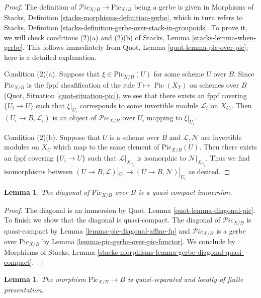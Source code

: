 \documentclass{stacks-project}
\theoremstyle{plain}
\newtheorem{lemma}[subsection]{Lemma}
\theoremstyle{definition}
\theoremstyle{remark}
\numberwithin{equation}{subsection}
\def\Pic{\mathop{\mathrm{Pic}}\nolimits}
\def\Picardstack{\mathcal{P}\!\mathit{ic}}
\def\Picardfunctor{\mathrm{Pic}}
\begin{document}
\begin{proof}
The definition of $\Picardstack_{X/B} \to \Picardfunctor_{X/B}$ being
a gerbe is given in Morphisms of Stacks, Definition
\ref{stacks-morphisms-definition-gerbe}, which in turn refers to
Stacks, Definition \ref{stacks-definition-gerbe-over-stack-in-groupoids}.
To prove it, we will check conditions (2)(a) and (2)(b) of
Stacks, Lemma \ref{stacks-lemma-when-gerbe}. This follows immediately from
Quot, Lemma \ref{quot-lemma-pic-over-pic}; here is a detailed explanation.

\medskip\noindent
Condition (2)(a).
Suppose that $\xi \in \Picardfunctor_{X/B}(U)$ for some scheme $U$ over $B$.
Since $\Picardfunctor_{X/B}$ is the fppf sheafification of the rule
$T \mapsto \Pic(X_T)$ on schemes over $B$
(Quot, Situation \ref{quot-situation-pic}), we see that there exists an
fppf covering $\{U_i \to U\}$ such that $\xi|_{U_i}$ corresponds
to some invertible module $\mathcal{L}_i$ on $X_{U_i}$.
Then $(U_i \to B, \mathcal{L}_i)$ is an object of
$\Picardstack_{X/B}$ over $U_i$ mapping to $\xi|_{U_i}$.

\medskip\noindent
Condition (2)(b). Suppose that $U$ is a scheme over $B$ and
$\mathcal{L}, \mathcal{N}$ are invertible modules on $X_U$
which map to the same element of $\Picardfunctor_{X/B}(U)$.
Then there exists an fppf covering $\{U_i \to U\}$
such that $\mathcal{L}|_{X_{U_i}}$ is isomorphic to $\mathcal{N}|_{X_{U_i}}$.
Thus we find isomorphisms between
$(U \to B, \mathcal{L})|_{U_i} \to (U \to B, \mathcal{N})|_{U_i}$
as desired.
\end{proof}

\begin{lemma}
\label{lemma-pic-functor-diagonal-qc-immersion}
The diagonal of $\Picardfunctor_{X/B}$ over $B$ is a quasi-compact immersion.
\end{lemma}

\begin{proof}
The diagonal is an immersion by Quot, Lemma \ref{quot-lemma-diagonal-pic}.
To finish we show that the diagonal is quasi-compact.
The diagonal of $\Picardstack_{X/B}$ is quasi-compact
by Lemma \ref{lemma-pic-diagonal-affine-fp} and
$\Picardstack_{X/B}$ is a gerbe over $\Picardfunctor_{X/B}$ by
Lemma \ref{lemma-pic-gerbe-over-pic-functor}.
We conclude by Morphisms of Stacks, Lemma
\ref{stacks-morphisms-lemma-gerbe-diagonal-quasi-compact}.
\end{proof}

\begin{lemma}
\label{lemma-pic-functor-qs-lfp}
The morphism $\Picardfunctor_{X/B} \to B$ is quasi-separated and
locally of finite presentation.
\end{lemma}
\end{document}
